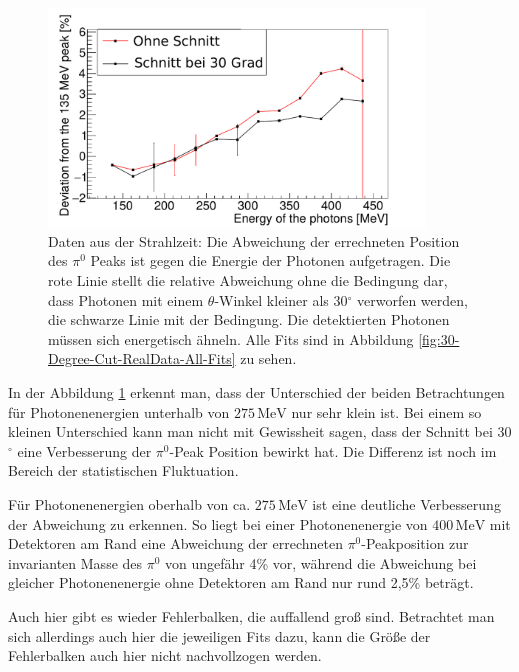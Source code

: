 \documentclass[a4paper,11pt,oneside,final,german,openbib,pdftex]{scrbook}
\begin{document}
{\begin{figure}[h!]
	\begin{center}
		\includegraphics[width=100mm]{20170405StrahlzeitBothDeviation}
		\caption[Strahlzeit: Vernachl\"assigung der Detektoren am Rand; Abweichung]{Daten aus der Strahlzeit: Die Abweichung der errechneten Position des $\pi^0$ Peaks ist gegen die Energie der Photonen aufgetragen. Die rote Linie stellt die relative Abweichung ohne die Bedingung dar, dass Photonen mit einem $\theta$-Winkel kleiner als 30$^{\circ}$ verworfen werden, die schwarze Linie mit der Bedingung. Die detektierten Photonen m\"ussen sich energetisch \"ahneln. Alle Fits sind in Abbildung \ref{fig:30-Degree-Cut-RealData-All-Fits} zu sehen.}
		\label{fig:Vernachlaessigung-Detektoren-am-Rand}
	\end{center}
\end{figure}

 

In der Abbildung \ref{fig:Vernachlaessigung-Detektoren-am-Rand} erkennt man, dass der Unterschied der beiden Betrachtungen f\"ur Photonenenergien unterhalb von $275\,\text{MeV}$ nur sehr klein ist. Bei einem so kleinen Unterschied kann man nicht mit Gewissheit sagen, dass der Schnitt bei 30$^{\circ}$ eine Verbesserung der $\pi^0$-Peak Position bewirkt hat. Die Differenz ist noch im Bereich der statistischen Fluktuation. 

F\"ur Photonenenergien oberhalb von ca. $ 275\,\text{MeV}$ ist eine deutliche Verbesserung der Abweichung zu erkennen. So liegt bei einer Photonenenergie von $400\,\text{MeV}$ mit Detektoren am Rand eine Abweichung der errechneten $\pi^0$-Peakposition zur invarianten Masse des $\pi^0$ von ungefähr 4\% vor, w\"ahrend die Abweichung bei gleicher Photonenenergie ohne Detektoren am Rand nur rund 2,5\% betr\"agt. 

Auch hier gibt es wieder Fehlerbalken, die auffallend gro{\ss} sind. Betrachtet man sich allerdings auch hier die jeweiligen Fits dazu, kann die Gr\"o{\ss}e der Fehlerbalken auch hier nicht nachvollzogen werden.

}
\end{document}
